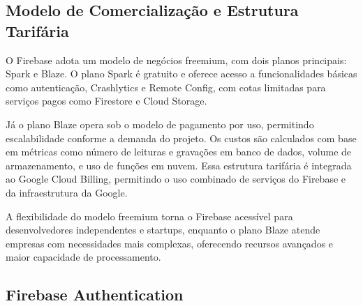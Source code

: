 \subsection{Modelo de Comercialização e Estrutura Tarifária}

O Firebase adota um modelo de negócios freemium, com dois planos principais: Spark e Blaze. O plano Spark é gratuito e oferece acesso a funcionalidades básicas como autenticação, Crashlytics e Remote Config, com cotas limitadas para serviços pagos como Firestore e Cloud Storage\cite{firebase2025pricing}.

Já o plano Blaze opera sob o modelo de pagamento por uso, permitindo escalabilidade conforme a demanda do projeto. Os custos são calculados com base em métricas como número de leituras e gravações em banco de dados, volume de armazenamento, e uso de funções em nuvem. Essa estrutura tarifária é integrada ao Google Cloud Billing, permitindo o uso combinado de serviços do Firebase e da infraestrutura da Google.

A flexibilidade do modelo freemium torna o Firebase acessível para desenvolvedores independentes e startups, enquanto o plano Blaze atende empresas com necessidades mais complexas, oferecendo recursos avançados e maior capacidade de processamento.


\begin{comment}
O Firebase opera sob um modelo de negócios freemium, caracterizado pela disponibilização gratuita de funcionalidades básicas combinada com planos pagos para recursos avançados e maior capacidade de processamento \cite{google2023pricing}. Esta estrutura tarifária escalonável permite que desenvolvedores individuais e pequenas equipes iniciem projetos sem investimento inicial, enquanto organizações com demandas mais robustas podem optar por planos comerciais adequados às suas necessidades específicas.

A estratégia de precificação adotada segue uma lógica de pay-as-you-scale, onde os custos são proporcionais ao volume de utilização dos recursos, incluindo métricas como número de usuários ativos, volume de dados armazenados e quantidade de operações de leitura/escrita realizadas \cite{moroney2022firebase}. Esta abordagem visa garantir a viabilidade econômica tanto para projetos em fase inicial quanto para aplicações consolidadas com grande base de usuários.
\end{comment}
\subsection{Firebase Authentication}


